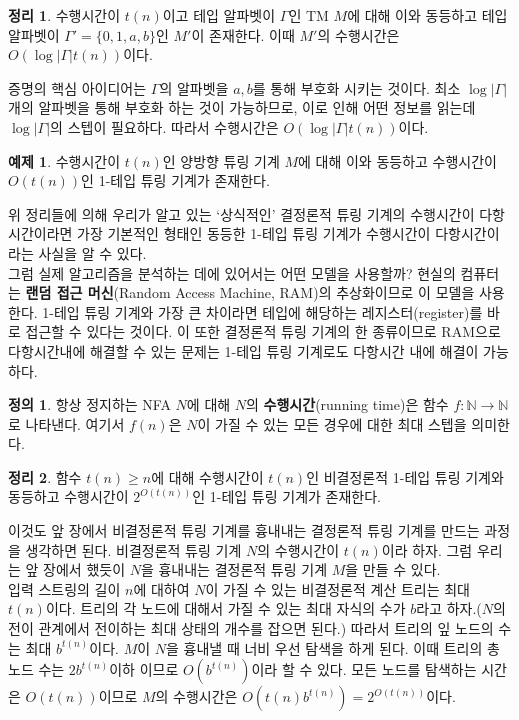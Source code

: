 \documentclass[b5paper]{book}
\theoremstyle{definition}
\newtheorem{defn}{정의}[chapter]
\newtheorem{thm}{정리}[chapter]
\newtheorem{ex}{예제}[chapter]
\newenvironment{pf*}{\pushQED{\qed}\pf}{\popQED\endpf}
\begin{document}
\begin{thm}
    수행시간이 $t(n)$이고 테입 알파벳이 $\Gamma$인 TM $M$에 대해 이와 동등하고 테입 알파벳이 $\Gamma' =
     \{0,1,a,b\}$인 
    $M'$이 존재한다. 이때 $M'$의 수행시간은 $O(\log\vert\Gamma\vert t(n))$이다. 
\end{thm}
\begin{pf*}
    증명의 핵심 아이디어는 $\Gamma$의 알파벳을 $a, b$를 통해 부호화 시키는 것이다. 최소 $\log
    \vert\Gamma\vert$개의 알파벳을 통해 부호화 하는 것이 가능하므로, 이로 인해 어떤 정보를 읽는데
    $\log\vert\Gamma\vert$의 스텝이 필요하다. 따라서 수행시간은 $O(\log\vert\Gamma\vert t(n))$이다.
\end{pf*}
\begin{ex}
    수행시간이 $t(n)$인 양방향 튜링 기계 $M$에 대해 이와 
    동등하고 수행시간이 $O(t(n))$인 1-테입 튜링 기계가 존재한다.
\end{ex}
위 정리들에 의해 우리가 알고 있는 `상식적인' 결정론적 튜링 기계의 수행시간이 다항시간이라면 
가장 기본적인 형태인 동등한 1-테입 튜링 기계가 수행시간이 다항시간이라는 사실을 알 수 있다.\\ 
그럼 실제 알고리즘을 분석하는 데에 있어서는 어떤 모델을 사용할까? 현실의 컴퓨터는 \textbf{랜덤 접근 머신}(Random 
Access Machine, RAM)의 추상화이므로 이 모델을 사용한다. 1-테입 튜링 기계와 가장 큰 차이라면
테입에 해당하는 레지스터(register)를 바로 접근할 수 있다는 것이다. 이 또한 결정론적 튜링 기계의 한 종류이므로
RAM으로 다항시간내에 해결할 수 있는 문제는 1-테입 튜링 기계로도 다항시간 내에 해결이 가능하다.
\begin{defn}
    항상 정지하는 NFA $N$에 대해 $N$의 \textbf{수행시간}(running time)은 함수 $f:
    \mathbb{N}\rightarrow \mathbb{N}$로 나타낸다. 여기서 $f(n)$은 $N$이 가질 수 있는
    모든 경우에 대한 최대 스텝을 의미한다. 
\end{defn}
\begin{thm}
    함수 $t(n) \ge n$에 대해 수행시간이 $t(n)$인 비결정론적 1-테입 튜링 기계와 동등하고
    수행시간이 $2^{O(t(n))}$인 1-테입 튜링 기계가 존재한다. 
\end{thm}
\begin{pf*}
    이것도 앞 장에서 비결정론적 튜링 기계를 흉내내는 결정론적 튜링 기계를 만드는 과정을
    생각하면 된다. 비결정론적 튜링 기계 $N$의 수행시간이 $t(n)$이라 하자. 그럼 우리는 앞 장에서 했듯이
    $N$을 흉내내는 결정론적 튜링 기계 $M$을 만들 수 있다. \\ 
    입력 스트링의 길이 $n$에 대하여 $N$이 가질 수 있는 비결정론적 계산 트리는 최대 $t(n)$이다. 트리의 
    각 노드에 대해서 가질 수 있는 최대 자식의 수가 $b$라고 하자.($N$의 전이 관계에서 전이하는 최대 상태의 개수를
    잡으면 된다.) 따라서 트리의 잎 노드의 수는 최대 $b^{t(n)}$이다. $M$이 $N$을 흉내낼 때 너비 우선 탐색을 하게 
    된다. 이때 트리의 총 노드 수는 $2b^{t(n)}$이하 이므로 $O(b^{t(n)})$이라 할 수 있다. 모든 노드를
    탐색하는 시간은 $O(t(n))$이므로 $M$의 수행시간은 $O(t(n)b^{t(n)}) = 2^{O(t(n))}$이다. 
\end{pf*}
\end{document}

